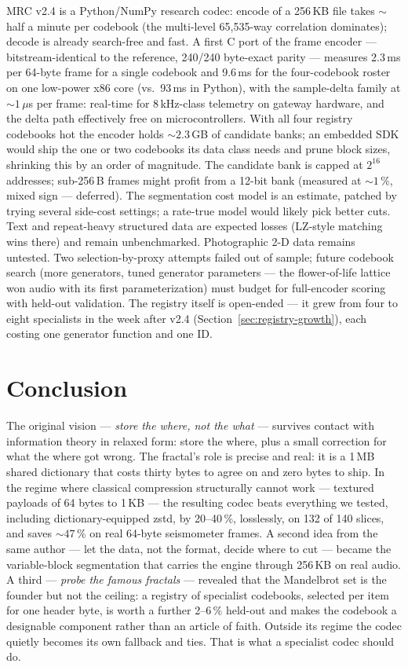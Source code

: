 \documentclass[11pt,a4paper]{article}
\begin{document}
MRC v2.4 is a Python/NumPy research codec: encode of a 256\,KB file takes
${\sim}$half a minute per codebook (the multi-level 65{,}535-way correlation
dominates); decode is already search-free and fast. A first C port of the
frame encoder --- bitstream-identical to the reference, 240/240 byte-exact
parity --- measures 2.3\,ms per 64-byte frame for a single codebook and
9.6\,ms for the four-codebook roster on one low-power x86 core (vs.\ 93\,ms
in Python), with the sample-delta family at ${\sim}1\,\mu$s per frame:
real-time for 8\,kHz-class telemetry on gateway hardware, and the delta
path effectively free on microcontrollers. With all four
registry codebooks hot the encoder holds ${\sim}2.3$\,GB of candidate banks;
an embedded SDK would ship the one or two codebooks its data class needs and
prune block sizes, shrinking this by an order of magnitude. The candidate bank
is capped at $2^{16}$ addresses; sub-256\,B frames might profit from a 12-bit
bank (measured at ${\sim}1\,\%$, mixed sign --- deferred). The segmentation
cost model is an estimate, patched by trying several side-cost settings; a
rate-true model would likely pick better cuts. Text and repeat-heavy
structured data are expected losses (LZ-style matching wins there) and remain
unbenchmarked. Photographic 2-D data remains untested. Two selection-by-proxy
attempts failed out of sample; future codebook search (more generators, tuned
generator parameters --- the flower-of-life lattice won audio with its first
parameterization) must budget for full-encoder scoring with held-out
validation. The registry itself is open-ended --- it grew from four to eight specialists in the week after v2.4 (Section~\ref{sec:registry-growth}), each costing one generator function and one ID.

\section{Conclusion}

The original vision --- \emph{store the where, not the what} --- survives
contact with information theory in relaxed form: store the where, plus a
small correction for what the where got wrong. The fractal's role is precise
and real: it is a 1\,MB shared dictionary that costs thirty bytes to agree on
and zero bytes to ship. In the regime where classical compression
structurally cannot work --- textured payloads of 64 bytes to 1\,KB --- the
resulting codec beats everything we tested, including dictionary-equipped
zstd, by 20--40\,\%, losslessly, on 132 of 140 slices, and saves
${\sim}47\,\%$ on real 64-byte seismometer frames. A second idea from the
same author --- let the data, not the format, decide where to cut --- became
the variable-block segmentation that carries the engine through 256\,KB on
real audio. A third --- \emph{probe the famous fractals} --- revealed that the
Mandelbrot set is the founder but not the ceiling: a registry of specialist
codebooks, selected per item for one header byte, is worth a further
2--6\,\% held-out and makes the codebook a designable component rather than an
article of faith. Outside its regime the codec quietly becomes its own
fallback and ties. That is what a specialist codec should do.
\end{document}
